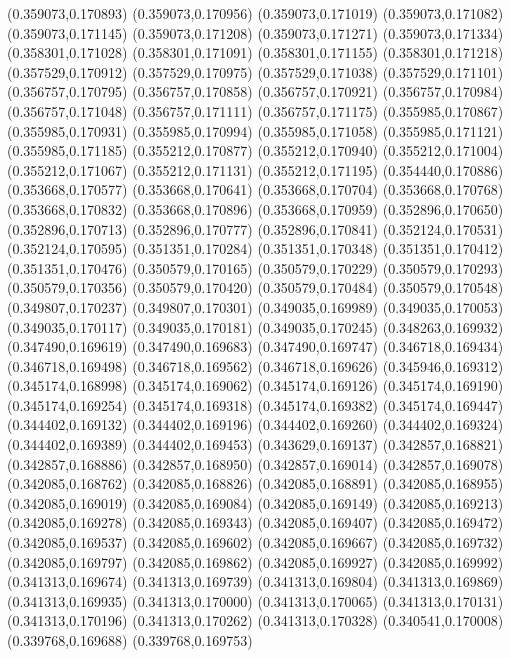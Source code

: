 (0.359073,0.170893)
(0.359073,0.170956)
(0.359073,0.171019)
(0.359073,0.171082)
(0.359073,0.171145)
(0.359073,0.171208)
(0.359073,0.171271)
(0.359073,0.171334)
(0.358301,0.171028)
(0.358301,0.171091)
(0.358301,0.171155)
(0.358301,0.171218)
(0.357529,0.170912)
(0.357529,0.170975)
(0.357529,0.171038)
(0.357529,0.171101)
(0.356757,0.170795)
(0.356757,0.170858)
(0.356757,0.170921)
(0.356757,0.170984)
(0.356757,0.171048)
(0.356757,0.171111)
(0.356757,0.171175)
(0.355985,0.170867)
(0.355985,0.170931)
(0.355985,0.170994)
(0.355985,0.171058)
(0.355985,0.171121)
(0.355985,0.171185)
(0.355212,0.170877)
(0.355212,0.170940)
(0.355212,0.171004)
(0.355212,0.171067)
(0.355212,0.171131)
(0.355212,0.171195)
(0.354440,0.170886)
(0.353668,0.170577)
(0.353668,0.170641)
(0.353668,0.170704)
(0.353668,0.170768)
(0.353668,0.170832)
(0.353668,0.170896)
(0.353668,0.170959)
(0.352896,0.170650)
(0.352896,0.170713)
(0.352896,0.170777)
(0.352896,0.170841)
(0.352124,0.170531)
(0.352124,0.170595)
(0.351351,0.170284)
(0.351351,0.170348)
(0.351351,0.170412)
(0.351351,0.170476)
(0.350579,0.170165)
(0.350579,0.170229)
(0.350579,0.170293)
(0.350579,0.170356)
(0.350579,0.170420)
(0.350579,0.170484)
(0.350579,0.170548)
(0.349807,0.170237)
(0.349807,0.170301)
(0.349035,0.169989)
(0.349035,0.170053)
(0.349035,0.170117)
(0.349035,0.170181)
(0.349035,0.170245)
(0.348263,0.169932)
(0.347490,0.169619)
(0.347490,0.169683)
(0.347490,0.169747)
(0.346718,0.169434)
(0.346718,0.169498)
(0.346718,0.169562)
(0.346718,0.169626)
(0.345946,0.169312)
(0.345174,0.168998)
(0.345174,0.169062)
(0.345174,0.169126)
(0.345174,0.169190)
(0.345174,0.169254)
(0.345174,0.169318)
(0.345174,0.169382)
(0.345174,0.169447)
(0.344402,0.169132)
(0.344402,0.169196)
(0.344402,0.169260)
(0.344402,0.169324)
(0.344402,0.169389)
(0.344402,0.169453)
(0.343629,0.169137)
(0.342857,0.168821)
(0.342857,0.168886)
(0.342857,0.168950)
(0.342857,0.169014)
(0.342857,0.169078)
(0.342085,0.168762)
(0.342085,0.168826)
(0.342085,0.168891)
(0.342085,0.168955)
(0.342085,0.169019)
(0.342085,0.169084)
(0.342085,0.169149)
(0.342085,0.169213)
(0.342085,0.169278)
(0.342085,0.169343)
(0.342085,0.169407)
(0.342085,0.169472)
(0.342085,0.169537)
(0.342085,0.169602)
(0.342085,0.169667)
(0.342085,0.169732)
(0.342085,0.169797)
(0.342085,0.169862)
(0.342085,0.169927)
(0.342085,0.169992)
(0.341313,0.169674)
(0.341313,0.169739)
(0.341313,0.169804)
(0.341313,0.169869)
(0.341313,0.169935)
(0.341313,0.170000)
(0.341313,0.170065)
(0.341313,0.170131)
(0.341313,0.170196)
(0.341313,0.170262)
(0.341313,0.170328)
(0.340541,0.170008)
(0.339768,0.169688)
(0.339768,0.169753)
